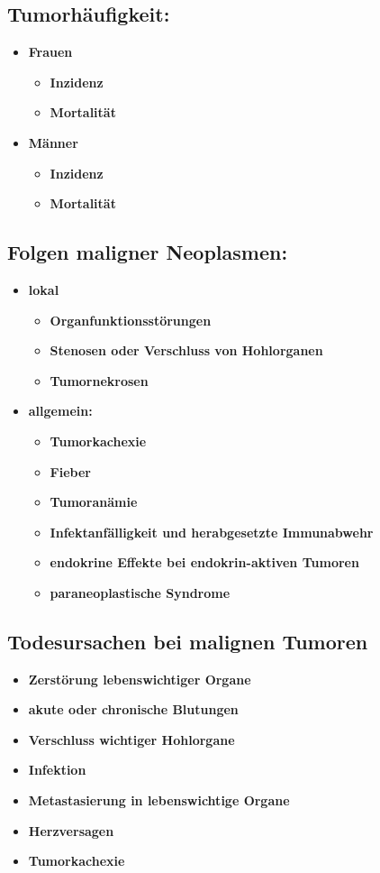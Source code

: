 	\subsection{Tumorhäufigkeit:}
		\begin{itemize}
			\item \textbf{Frauen}
				\begin{itemize}
					\item \textbf{Inzidenz}
					\item \textbf{Mortalität}
				\end{itemize}
			\item \textbf{Männer}
				\begin{itemize}
					\item \textbf{Inzidenz}
					\item \textbf{Mortalität}
				\end{itemize}
		\end{itemize}
	\subsection{Folgen maligner Neoplasmen:}
		\begin{itemize}
			\item \textbf{lokal}
				\begin{itemize}
					\item \textbf{Organfunktionsstörungen}
					\item \textbf{Stenosen oder Verschluss von Hohlorganen}
					\item \textbf{Tumornekrosen}
				\end{itemize}
			\item \textbf{allgemein:}
				\begin{itemize}
					\item \textbf{Tumorkachexie}
					\item \textbf{Fieber}
					\item \textbf{Tumoranämie}
					\item \textbf{Infektanfälligkeit und herabgesetzte Immunabwehr}
					\item \textbf{endokrine Effekte bei endokrin-aktiven Tumoren}
					\item \textbf{paraneoplastische Syndrome}
				\end{itemize}
		\end{itemize}
	\subsection{Todesursachen bei malignen Tumoren}
		\begin{itemize}
			\item \textbf{Zerstörung lebenswichtiger Organe}
			\item \textbf{akute oder chronische Blutungen}
			\item \textbf{Verschluss wichtiger Hohlorgane}
			\item \textbf{Infektion}
			\item \textbf{Metastasierung in lebenswichtige Organe}
			\item \textbf{Herzversagen}
			\item \textbf{Tumorkachexie}
		\end{itemize}
